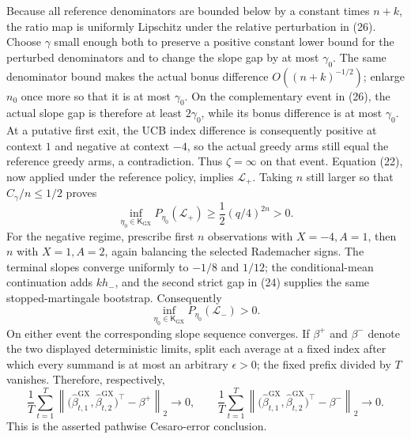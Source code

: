 Because all reference denominators are bounded below by a constant times \(n+k\), the ratio map is uniformly Lipschitz under the relative perturbation in (26).  Choose \(\gamma\) small enough both to preserve a positive constant lower bound for the perturbed denominators and to change the slope gap by at most \(\gamma_0\).  The same denominator bound makes the actual bonus difference \(O((n+k)^{-1/2})\); enlarge \(n_0\) once more so that it is at most \(\gamma_0\).  On the complementary event in (26), the actual slope gap is therefore at least \(2\gamma_0\), while its bonus difference is at most \(\gamma_0\).  At a putative first exit, the UCB index difference is consequently positive at context \(1\) and negative at context \(-4\), so the actual greedy arms still equal the reference greedy arms, a contradiction.  Thus \(\zeta=\infty\) on that event.  Equation (22), now applied under the reference policy, implies \(\mathcal L_+\).  Taking \(n\) still larger so that \(C_\gamma/n\leq1/2\) proves
\[
 \inf_{\eta_0\in\mathsf K_{\mathrm{GX}}}P_{\eta_0}(\mathcal L_+)
 \geq \frac12(q/4)^{2n}>0. \tag{27}
\]
For the negative regime, prescribe first \(n\) observations with \(X=-4,A=1\), then \(n\) with \(X=1,A=2\), again balancing the selected Rademacher signs.  The terminal slopes converge uniformly to \(-1/8\) and \(1/12\); the conditional-mean continuation adds \(kh_-\), and the second strict gap in (24) supplies the same stopped-martingale bootstrap.  Consequently
\[
 \inf_{\eta_0\in\mathsf K_{\mathrm{GX}}}P_{\eta_0}(\mathcal L_-)>0. \tag{28}
\]
On either event the corresponding slope sequence converges.  If \(\beta^+\) and \(\beta^-\) denote the two displayed deterministic limits, split each average at a fixed index after which every summand is at most an arbitrary \(\epsilon>0\); the fixed prefix divided by \(T\) vanishes.  Therefore, respectively,
\[
 \frac1T\sum_{t=1}^T\left\|\bigl(\widehat\beta^{\mathrm{GX}}_{t,1},\widehat\beta^{\mathrm{GX}}_{t,2}\bigr)^\top-\beta^+\right\|_2\longrightarrow0,
 \qquad
 \frac1T\sum_{t=1}^T\left\|\bigl(\widehat\beta^{\mathrm{GX}}_{t,1},\widehat\beta^{\mathrm{GX}}_{t,2}\bigr)^\top-\beta^-\right\|_2\longrightarrow0.
\]
This is the asserted pathwise Cesaro-error conclusion.

